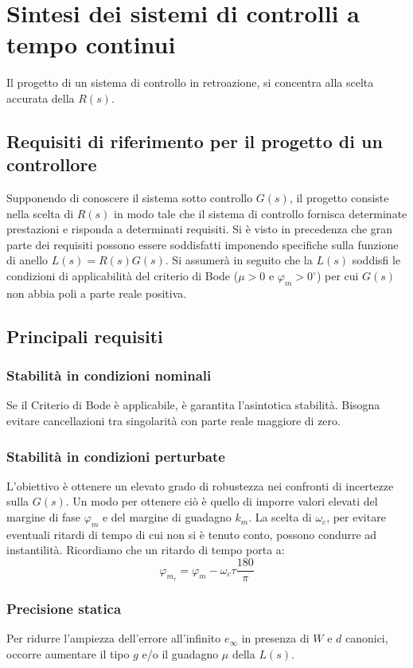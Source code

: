 \documentclass[a4paper]{report}
\begin{document}
\section{Sintesi dei sistemi di controlli a tempo continui}
Il progetto di un sistema di controllo in retroazione, si concentra
alla scelta accurata della $R(s)$.

\subsection{Requisiti di riferimento per il progetto di un
  controllore}

Supponendo di conoscere il sistema sotto controllo $G(s)$, il progetto
consiste nella scelta di $R(s)$ in modo tale che il sistema di
controllo fornisca determinate prestazioni e risponda a determinati
requisiti. Si \`e visto in precedenza che gran parte dei requisiti
possono essere soddisfatti imponendo specifiche sulla funzione di
anello $L(s) = R(s) G(s)$. Si assumer\`a in seguito che la $L(s)$
soddisfi le condizioni di applicabilit\`a del criterio di Bode ($\mu >
0$ e $\varphi_m > 0^{\circ}$) per cui $G(s)$ non abbia poli a parte
reale positiva.

\subsection{Principali requisiti}
\subsubsection{Stabilit\`a in condizioni nominali}
Se il Criterio di Bode \`e applicabile, \`e garantita l'asintotica
stabilit\`a. Bisogna evitare cancellazioni tra singolarit\`a con parte
reale maggiore di zero.
\subsubsection{Stabilit\`a in condizioni perturbate}
L'obiettivo \`e ottenere un elevato grado di robustezza nei confronti
di incertezze sulla $G(s)$. Un modo per ottenere ci\`o \`e quello di
imporre valori elevati del margine di fase $\varphi_m$ e del margine
di guadagno $k_m$. La scelta di $\omega_c$, per evitare eventuali
ritardi di tempo di cui non si \`e tenuto conto, possono condurre ad
instantilit\`a. Ricordiamo che un ritardo di tempo porta a:
\[
\varphi_{m_{\tau}} = \varphi_m - \omega_c \tau \dfrac{180}{\pi}
\]
\subsubsection{Precisione statica}
Per ridurre l'ampiezza dell'errore all'infinito $e_{\infty}$ in
presenza di $W$ e $d$ canonici, occorre aumentare il tipo $g$ e/o il
guadagno $\mu$ della $L(s)$.
\end{document}
